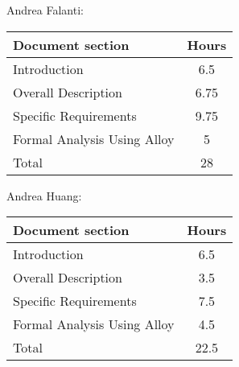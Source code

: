 Andrea Falanti:

\begin{tabular}{|l|c|}
    \hline
    Document section & Hours \\
    \hline
     Introduction & 6.5\\
     Overall Description & 6.75\\
     Specific Requirements & 9.75\\
     Formal Analysis Using Alloy & 5\\
     \hline
     Total & 28\\
     \hline
\end{tabular}
\vskip 0.3in

Andrea Huang:

\begin{tabular}{|l|c|}
    \hline
    Document section & Hours \\
    \hline
     Introduction &  6.5\\
     Overall Description & 3.5\\
     Specific Requirements & 7.5\\
     Formal Analysis Using Alloy & 4.5\\
     \hline
     Total & 22.5\\
     \hline
\end{tabular}